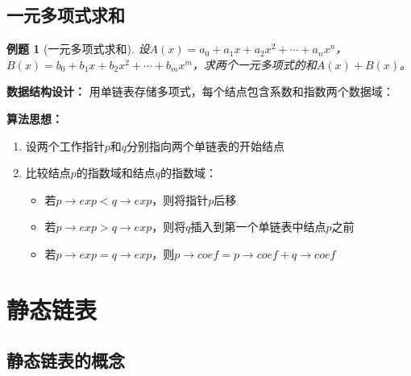 \documentclass[12pt,a4paper]{amsart}
\newtheorem{example}{例题}[section]
\begin{document}
\subsection{一元多项式求和}

\begin{example}[一元多项式求和]
设$A(x) = a_0 + a_1x + a_2x^2 + \cdots + a_nx^n$，$B(x) = b_0 + b_1x + b_2x^2 + \cdots + b_mx^m$，求两个一元多项式的和$A(x) + B(x)$。
\end{example}

\textbf{数据结构设计：}
用单链表存储多项式，每个结点包含系数和指数两个数据域：

\begin{center}
\end{center}

\textbf{算法思想：}
\begin{enumerate}
\item 设两个工作指针$p$和$q$分别指向两个单链表的开始结点
\item 比较结点$p$的指数域和结点$q$的指数域：
    \begin{itemize}
    \item 若$p \rightarrow exp < q \rightarrow exp$，则将指针$p$后移
    \item 若$p \rightarrow exp > q \rightarrow exp$，则将$q$插入到第一个单链表中结点$p$之前
    \item 若$p \rightarrow exp = q \rightarrow exp$，则$p \rightarrow coef = p \rightarrow coef + q \rightarrow coef$
    \end{itemize}
\end{enumerate}

\section{静态链表}

\subsection{静态链表的概念}
\end{document}
